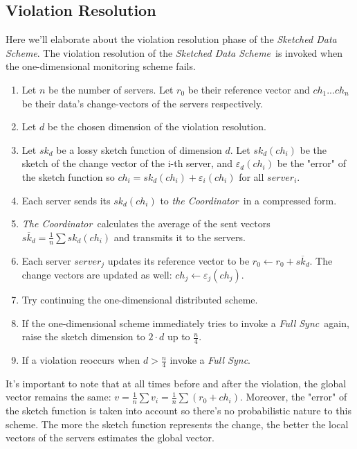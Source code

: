 \documentclass[10pt, conference]{IEEEtran}
\newcommand{\sketchScheme}{\textit{Sketched Data Scheme}}
\newcommand{\fullSync}{\textit{Full Sync}}
\newcommand{\theCoordinator}{\textit{the Coordinator}}
\newcommand{\TheCoordinator}{\textit{The Coordinator}}
\begin{document}
\subsection{Violation Resolution}
Here we'll elaborate about the violation resolution phase of the \sketchScheme . The violation resolution of the \sketchScheme \ is invoked when the one-dimensional monitoring scheme fails. 
\begin{enumerate}
\item Let $n$ be the number of servers. Let $r_0$ be their reference vector and $ch_1 ... ch_n$ be their data's change-vectors of the servers respectively.
\item Let $d$ be the chosen dimension of the violation resolution.
\item Let $sk_d$ be a lossy sketch function of dimension $d$. Let $sk_d (ch_i)$ be the sketch of the change vector of the i-th server, and $\varepsilon _d(ch_i)$ be the "error" of the sketch function so ${ch_i = sk_d(ch_i) + \varepsilon _i(ch_i)}$ for all $server_i$.
\item Each server sends its $sk_d(ch_i)$ to \theCoordinator \ in a compressed form.
\item \TheCoordinator \ calculates the average of the sent vectors ${\overline{sk_d} = \frac{1}{n}\sum sk_d(ch_i)}$ and transmits it to the servers.
\item Each server $server_j$ updates its reference vector to be ${r_0 \leftarrow r_0 + \overline{sk_d}}$. The change vectors are updated as well: ${ch_j \leftarrow \varepsilon _j(ch_j)}$.
\item Try continuing the one-dimensional distributed scheme.
\item If the one-dimensional scheme immediately tries to invoke a \fullSync \ again, raise the sketch dimension to $2\cdot d$ up to $\frac{n}{4}$.
\item If a violation reoccurs when ${d > \frac{n}{4}}$ invoke a \fullSync .
\end{enumerate} 
It's important to note that at all times before and after the violation, the global vector remains the same: ${v = \frac{1}{n}\sum v_i=\frac{1}{n}\sum (r_0 + ch_i)}$. Moreover, the "error" of the sketch function is taken into account so there's no probabilistic nature to this scheme. The more the sketch function represents the change, the  better the local vectors of the servers estimates the global vector.
\end{document}
